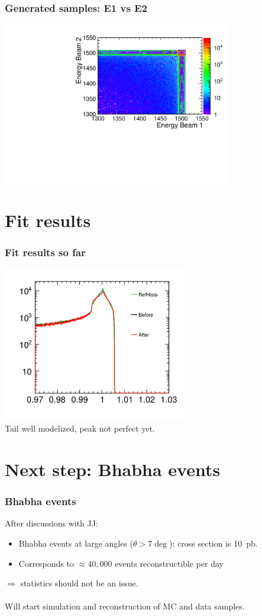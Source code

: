\documentclass{beamer}
\begin{document}
\begin{frame}
\frametitle{Generated samples: E1 vs E2}
\includegraphics[width=10cm]{E1_vs_E2_gen}
\end{frame}

\section{Fit results}
\begin{frame}
\frametitle{Fit results so far}
\includegraphics[width=8cm]{HistoGrams}\\
Tail well modelized, peak not perfect yet.
\end{frame}

\section{Next step: Bhabha events}
\begin{frame}
\frametitle{Bhabha events}
After discussions with JJ:
\begin{itemize}
  \item Bhabha events at large angles ($\theta > 7\deg$): cross section is
  10~pb.
  \item Corresponds to $\approx 40,000$ events reconstructible per day
\end{itemize}
$\Rightarrow$ statistics should not be an issue.\\
~\\
Will start simulation and reconstruction of MC and data samples.
\end{frame}
\end{document}
